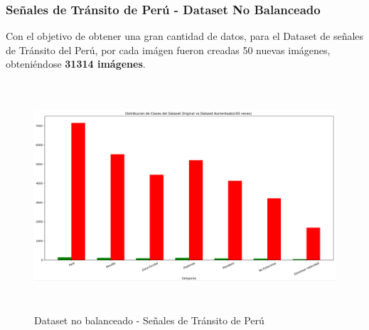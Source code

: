 	
		\subsubsection{Señales de Tránsito de Perú - Dataset No Balanceado}
			Con el objetivo de obtener una gran cantidad de datos, para el Dataset de señales de Tránsito del Perú, por cada imágen fueron creadas 50 nuevas imágenes, obteniéndose {\bf 31314 imágenes}.
			\begin{figure}[H]
				\includegraphics[width=1\textwidth, height=8.5cm]{images/desarrollo/histograms/train_extended_per_51_31314}
				\begin{center}
				\caption{\small{Dataset no balanceado - Señales de Tránsito de Perú}}
				
				{\small{\fontsize{10}{16.8}\selectfont {Fuente: Elaboración propia}}}
				\end{center}
			\end{figure}

